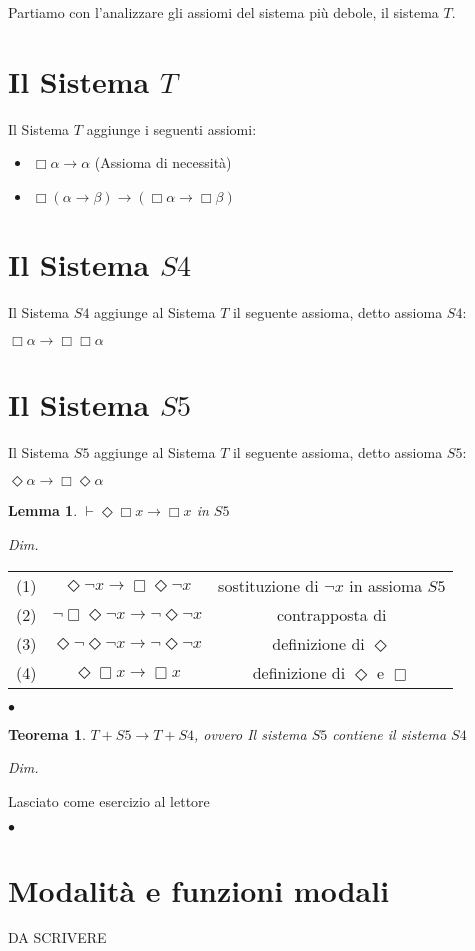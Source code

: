 \documentclass[a4paper, 12pt]{article}
\newtheorem{theorem}{Teorema}
\newtheorem{lemma}{Lemma}
\newenvironment{proof}
    {\textit{Dim.}
    }
    {\begin{flushright}$\bullet$\end{flushright}
    }
\begin{document}
Partiamo con l'analizzare gli assiomi del sistema pi\`u debole, il sistema $T$.

\section{Il Sistema $T$}
Il Sistema $T$ aggiunge i seguenti assiomi:
\begin{itemize}
\item $\Box \alpha \rightarrow \alpha$ (Assioma di necessit\`a)
\item $\Box (\alpha \rightarrow \beta) \rightarrow (\Box \alpha \rightarrow \Box \beta)$
\end{itemize}

\section{Il Sistema $S4$}
Il Sistema $S4$ aggiunge al Sistema $T$ il seguente assioma, detto assioma $S4$:

$\Box \alpha \rightarrow \Box \Box \alpha$

\section{Il Sistema $S5$}
Il Sistema $S5$ aggiunge al Sistema $T$ il seguente assioma, detto assioma $S5$:

$\Diamond \alpha \rightarrow \Box \Diamond \alpha$

\begin{lemma}
$\vdash \Diamond \Box x \rightarrow \Box x$ in $S5$
\end{lemma}
\begin{proof}

\begin{tabular} { c c|c }
(1) & $\Diamond \neg x \rightarrow \Box \Diamond \neg x$ & sostituzione di $\neg x$ in assioma $S5$ \\
(2) & $\neg \Box \Diamond \neg x \rightarrow \neg \Diamond \neg x$ & contrapposta di \\
(3) & $\Diamond \neg \Diamond \neg x \rightarrow \neg \Diamond \neg x$ & definizione di $\Diamond$ \\
(4) & $\Diamond \Box x \rightarrow \Box x$ & definizione di $\Diamond$ e $\Box$
\end{tabular}
\end{proof}

\begin{theorem}
$T + S5 \rightarrow T + S4$, ovvero Il sistema $S5$ contiene il sistema $S4$
\end{theorem}
\begin{proof}
Lasciato come esercizio al lettore
\end{proof}

\section{Modalit\`a e funzioni modali}
DA SCRIVERE
\end{document}
